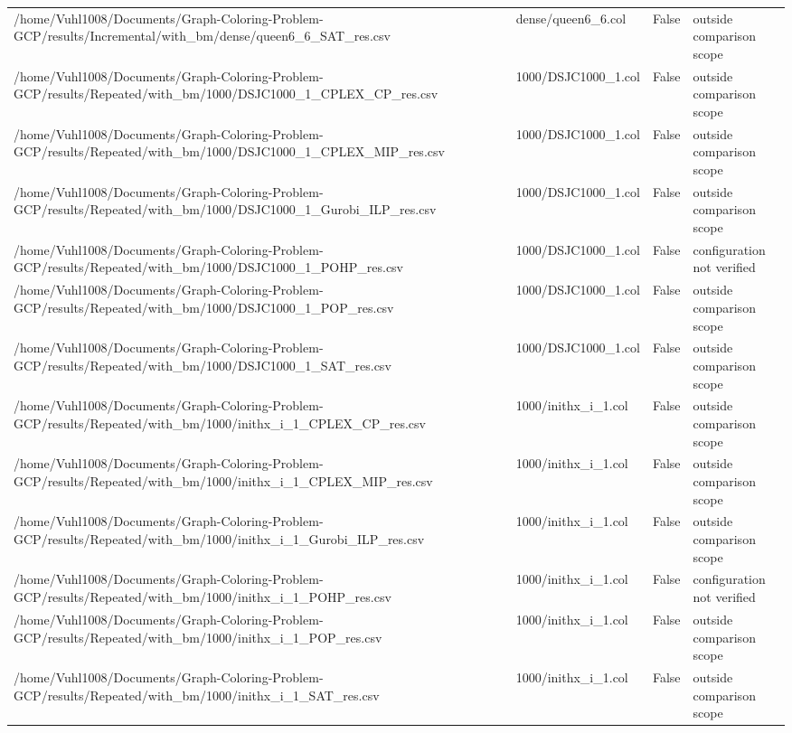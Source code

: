 \begin{table}[htbp]
\begin{tabular}{llll}
/home/Vuhl1008/Documents/Graph-Coloring-Problem-GCP/results/Incremental/with\_bm/dense/queen6\_6\_SAT\_res.csv & dense/queen6\_6.col & False & outside comparison scope \\
/home/Vuhl1008/Documents/Graph-Coloring-Problem-GCP/results/Repeated/with\_bm/1000/DSJC1000\_1\_CPLEX\_CP\_res.csv & 1000/DSJC1000\_1.col & False & outside comparison scope \\
/home/Vuhl1008/Documents/Graph-Coloring-Problem-GCP/results/Repeated/with\_bm/1000/DSJC1000\_1\_CPLEX\_MIP\_res.csv & 1000/DSJC1000\_1.col & False & outside comparison scope \\
/home/Vuhl1008/Documents/Graph-Coloring-Problem-GCP/results/Repeated/with\_bm/1000/DSJC1000\_1\_Gurobi\_ILP\_res.csv & 1000/DSJC1000\_1.col & False & outside comparison scope \\
/home/Vuhl1008/Documents/Graph-Coloring-Problem-GCP/results/Repeated/with\_bm/1000/DSJC1000\_1\_POHP\_res.csv & 1000/DSJC1000\_1.col & False & configuration not verified \\
/home/Vuhl1008/Documents/Graph-Coloring-Problem-GCP/results/Repeated/with\_bm/1000/DSJC1000\_1\_POP\_res.csv & 1000/DSJC1000\_1.col & False & outside comparison scope \\
/home/Vuhl1008/Documents/Graph-Coloring-Problem-GCP/results/Repeated/with\_bm/1000/DSJC1000\_1\_SAT\_res.csv & 1000/DSJC1000\_1.col & False & outside comparison scope \\
/home/Vuhl1008/Documents/Graph-Coloring-Problem-GCP/results/Repeated/with\_bm/1000/inithx\_i\_1\_CPLEX\_CP\_res.csv & 1000/inithx\_i\_1.col & False & outside comparison scope \\
/home/Vuhl1008/Documents/Graph-Coloring-Problem-GCP/results/Repeated/with\_bm/1000/inithx\_i\_1\_CPLEX\_MIP\_res.csv & 1000/inithx\_i\_1.col & False & outside comparison scope \\
/home/Vuhl1008/Documents/Graph-Coloring-Problem-GCP/results/Repeated/with\_bm/1000/inithx\_i\_1\_Gurobi\_ILP\_res.csv & 1000/inithx\_i\_1.col & False & outside comparison scope \\
/home/Vuhl1008/Documents/Graph-Coloring-Problem-GCP/results/Repeated/with\_bm/1000/inithx\_i\_1\_POHP\_res.csv & 1000/inithx\_i\_1.col & False & configuration not verified \\
/home/Vuhl1008/Documents/Graph-Coloring-Problem-GCP/results/Repeated/with\_bm/1000/inithx\_i\_1\_POP\_res.csv & 1000/inithx\_i\_1.col & False & outside comparison scope \\
/home/Vuhl1008/Documents/Graph-Coloring-Problem-GCP/results/Repeated/with\_bm/1000/inithx\_i\_1\_SAT\_res.csv & 1000/inithx\_i\_1.col & False & outside comparison scope \\

\end{tabular}
\end{table}
